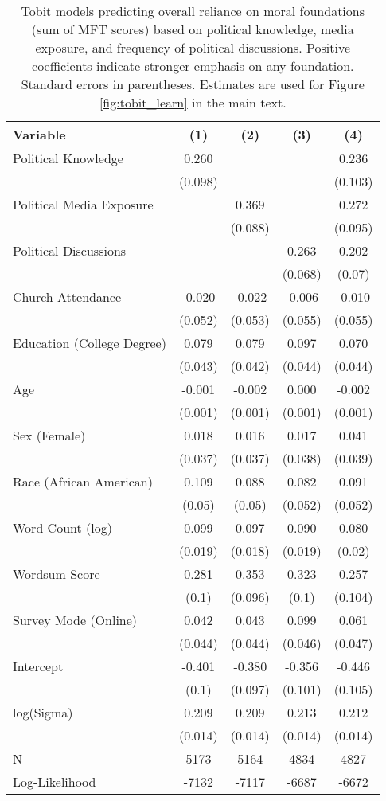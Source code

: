 \begin{table}[ht]
\centering
\caption{Tobit models predicting overall reliance on moral foundations
           (sum of MFT scores) based on political knowledge, media exposure, and frequency of 
           political discussions. Positive coefficients indicate stronger emphasis on any foundation.
           Standard errors in parentheses. Estimates are used for Figure \ref{fig:tobit_learn} in 
           the main text.} 
\label{tab:tobit_learn}
\begingroup\footnotesize
\begin{tabular}{lcccc}
  \hline
Variable & (1) & (2) & (3) & (4) \\ 
  \hline
Political Knowledge &  0.260 &  &  &  0.236 \\ 
   & (0.098) &  &  & (0.103) \\ 
  Political Media Exposure &  &  0.369 &  &  0.272 \\ 
   &  & (0.088) &  & (0.095) \\ 
  Political
Discussions &  &  &  0.263 &  0.202 \\ 
   &  &  & (0.068) & (0.07) \\ 
  Church Attendance & -0.020 & -0.022 & -0.006 & -0.010 \\ 
   & (0.052) & (0.053) & (0.055) & (0.055) \\ 
  Education (College Degree) &  0.079 &  0.079 &  0.097 &  0.070 \\ 
   & (0.043) & (0.042) & (0.044) & (0.044) \\ 
  Age & -0.001 & -0.002 &  0.000 & -0.002 \\ 
   & (0.001) & (0.001) & (0.001) & (0.001) \\ 
  Sex (Female) &  0.018 &  0.016 &  0.017 &  0.041 \\ 
   & (0.037) & (0.037) & (0.038) & (0.039) \\ 
  Race (African American) &  0.109 &  0.088 &  0.082 &  0.091 \\ 
   & (0.05) & (0.05) & (0.052) & (0.052) \\ 
  Word Count (log) &  0.099 &  0.097 &  0.090 &  0.080 \\ 
   & (0.019) & (0.018) & (0.019) & (0.02) \\ 
  Wordsum Score &  0.281 &  0.353 &  0.323 &  0.257 \\ 
   & (0.1) & (0.096) & (0.1) & (0.104) \\ 
  Survey Mode (Online) &  0.042 &  0.043 &  0.099 &  0.061 \\ 
   & (0.044) & (0.044) & (0.046) & (0.047) \\ 
  Intercept & -0.401 & -0.380 & -0.356 & -0.446 \\ 
   & (0.1) & (0.097) & (0.101) & (0.105) \\ 
  log(Sigma) &  0.209 &  0.209 &  0.213 &  0.212 \\ 
   & (0.014) & (0.014) & (0.014) & (0.014) \\ 
   \hline
N & 5173 & 5164 & 4834 & 4827 \\ 
  Log-Likelihood & -7132 & -7117 & -6687 & -6672 \\ 
   \hline
\end{tabular}
\endgroup
\end{table}
